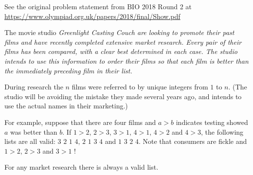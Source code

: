 \begin{center}\small{
    See the original problem statement from BIO 2018 Round 2 at
    \url{https://www.olympiad.org.uk/papers/2018/final/Show.pdf}
  }\end{center}

The movie studio \it{Greenlight Casting Couch} are looking to promote their past
films and have recently completed extensive market research. Every pair of their
films has been compared, with a clear best determined in each case. The studio
intends to use this information to order their films so that each film is better than
the \it{immediately} preceding film in their list.

During research the $n$ films were referred to by unique integers from $1$ to $n$.
(The studio will be avoiding the mistake they made several years ago, and intends
to use the actual names in their marketing.)

For example, suppose that there are four films and $a>b$ indicates testing
showed $a$ was better than $b$. If $1>2$, $2>3$, $3>1$, $4>1$, $4>2$ and $4>3$, the following
lists are all valid: $3$ $2$ $1$ $4$, $2$ $1$ $3$ $4$ and $1$ $3$ $2$ $4$.
Note that consumers are fickle and $1>2$, $2>3$ and $3>1$ !

For any market research there is always a valid list.
